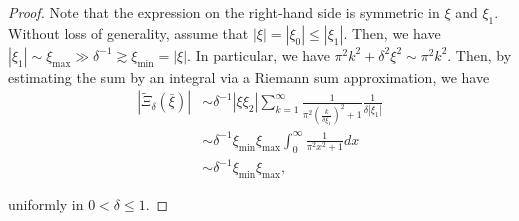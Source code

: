\documentclass[10pt,a4paper]{amsart}
\newcommand{\dl}{\delta}
\newcommand{\ges}{\gtrsim}
\newcommand{\noi}{\noindent}
\newcommand{\wt}{\widetilde}
\begin{document}
\begin{proof}
\noi
Note that the expression on the right-hand side is symmetric in $\xi$ and $\xi_1$.
Without loss of generality, assume that $|\xi| = |\xi_0| \le |\xi_1|$.
Then, we have $|\xi_1| \sim \xi_{\max}
\gg \dl^{-1} \ges \xi_{\min} = |\xi|$. 
In particular, we have 
$\pi^2k^2  +\dl^2\xi^2 \sim \pi^2 k^2$.
Then, by  estimating
the sum  by an integral via a Riemann sum approximation, we have 
\begin{align*}
|\wt \Xi_\dl(\bar \xi)|
& \sim \dl^{-1} |\xi  \xi_2|
 \sum_{k=1}^{\infty}   
 \frac{ 1}
 {\pi^2(\frac k{\dl \xi_1})^2  +1} \frac{1}{\dl |\xi_1|}\\
 & \sim 
    \dl^{-1} \xi_{\min}\xi_{\max}
\int_{0}^\infty
 \frac{ 1}
 {\pi^2x^2 +1}dx\\
& \sim    \dl^{-1} \xi_{\min}\xi_{\max}, 
\end{align*}

\noi
uniformly in $0 < \dl \le 1$.
\end{proof}
\end{document}
